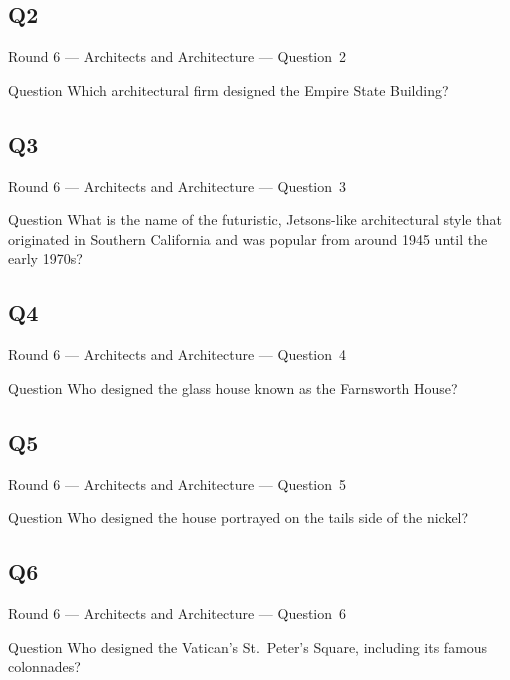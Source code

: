 \documentclass[11pt]{beamer}
\begin{document}
\subsection*{Q2}
\begin{frame}[t]{Round 6 --- Architects and Architecture --- \mbox{Question 2}}
\vspace{-0.5em}
\begin{block}{Question}
Which architectural firm designed the Empire State Building?
\end{block}
\end{frame}
\subsection*{Q3}
\begin{frame}[t]{Round 6 --- Architects and Architecture --- \mbox{Question 3}}
\vspace{-0.5em}
\begin{block}{Question}
What is the name of the futuristic, Jetsons-like architectural style that originated in Southern California and was popular from around 1945 until the early 1970s?
\end{block}
\end{frame}
\subsection*{Q4}
\begin{frame}[t]{Round 6 --- Architects and Architecture --- \mbox{Question 4}}
\vspace{-0.5em}
\begin{block}{Question}
Who designed the glass house known as the Farnsworth House?
\end{block}
\end{frame}
\subsection*{Q5}
\begin{frame}[t]{Round 6 --- Architects and Architecture --- \mbox{Question 5}}
\vspace{-0.5em}
\begin{block}{Question}
Who designed the house portrayed on the tails side of the nickel?
\end{block}
\end{frame}
\subsection*{Q6}
\begin{frame}[t]{Round 6 --- Architects and Architecture --- \mbox{Question 6}}
\vspace{-0.5em}
\begin{block}{Question}
Who designed the Vatican's St.\ Peter's Square, including its famous colonnades?
\end{block}
\end{frame}
\end{document}
